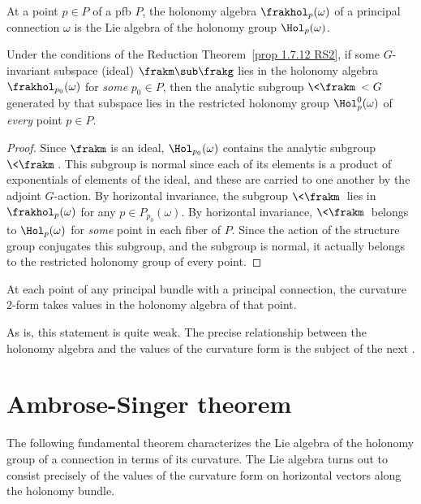 \begin{defn}
    At a point $p\in P$ of a \gls{pfb} $P$, the holonomy algebra $\frakhol_{p}(\omega)$ of a principal connection $\omega$ is the Lie algebra of the holonomy group $\Hol_p(\omega)$.
\end{defn}

\begin{cor}\label{cor 16.18 McKay}
    Under the conditions of the Reduction Theorem~\ref{prop 1.7.12 RS2}, if some $G$-invariant subspace (ideal) $\frakm\sub \frakg$ lies in the holonomy algebra $\frakhol_{p_0}(\omega)$ for \emph{some} $p_0\in P$, then the analytic subgroup $\<\frakm\><G$ generated by that subspace lies in the restricted holonomy group $\Hol_p^0(\omega)$ of \emph{every} point $p\in P$.
\end{cor}
\begin{proof}
    Since $\frakm$ is an ideal, $\Hol_{p_0}(\omega)$ contains the analytic subgroup $\<\frakm\>$. This subgroup is normal since each of its elements is a product of exponentials of elements of the ideal, and these are carried to one another by the adjoint $G$-action. By horizontal invariance, the subgroup $\<\frakm\>$ lies in $\frakhol_p(\omega)$ for any $p\in P_{p_0}(\omega)$. By horizontal invariance, $\<\frakm\>$ belongs to $\Hol_p(\omega)$ for \emph{some} point in each fiber of $P$. Since the action of the structure group conjugates this subgroup, and the subgroup is normal, it actually belongs to the restricted holonomy group of every point.
\end{proof}


\begin{cor}\label{cor 16.19 McKay}
    At each point of any principal bundle with a principal connection, the curvature $2$-form takes values in the holonomy algebra of that point.
\end{cor}

As is, this statement is quite weak. The precise relationship between the holonomy algebra and the values of the curvature form is the subject of the next \sect.






\section{Ambrose-Singer theorem}


The following fundamental theorem characterizes the Lie algebra of the holonomy group of a connection in terms of its curvature. The Lie algebra turns out to consist precisely of the values of the curvature form on horizontal vectors along the holonomy bundle.

